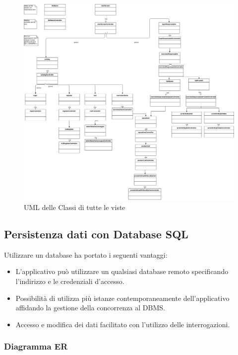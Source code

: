 \documentclass{article}
\begin{document}
\begin{figure}[h!]
	\centering
	\includegraphics[width=\textwidth]{UmlInterfaccie.jpg}
	\caption{UML delle Classi di tutte le viste}
	\label{fig:UmlInterfaccie}
\end{figure}

\clearpage
\subsection{Persistenza dati con Database SQL}
Utilizzare un database ha portato i seguenti vantaggi:
\begin{itemize}
	\item{
	      L'applicativo può utilizzare un qualsiasi database remoto specificando l'indirizzo e le credenziali d'accesso.}

	\item{
	      Possibilità di utilizza più istanze contemporaneamente dell'applicativo affidando la gestione
	      della concorrenza al DBMS.}
	\item{
	      Accesso e modifica dei dati facilitato con l'utilizzo delle interrogazioni.}
\end{itemize}

\subsubsection{Diagramma ER}
\end{document}
